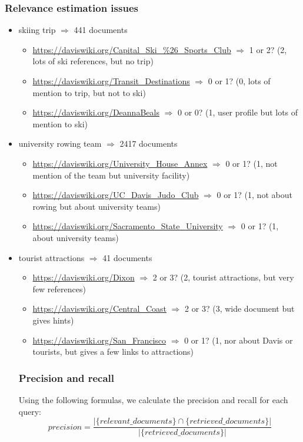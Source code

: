\subsubsection{Relevance estimation issues}
\begin{itemize}
    \item skiing trip $\Rightarrow$ 441 documents
    \begin{itemize}
        \item \url{https://daviswiki.org/Capital\_Ski\_\%26\_Sports\_Club} $\Rightarrow$  1 or 2? (2, lots of ski references, but no trip)
        \item \url{https://daviswiki.org/Transit\_Destinations} $\Rightarrow$  0 or 1? (0, lots of mention to trip, but not to ski)
        \item \url{https://daviswiki.org/DeannaBeals} $\Rightarrow$  0 or 0? (1, user profile but lots of mention to ski)
    \end{itemize}
    \item university rowing team $\Rightarrow$ 2417 documents
    \begin{itemize}
        \item \url{https://daviswiki.org/University\_House\_Annex} $\Rightarrow$  0 or 1? (1, not mention of the team but university facility)
        \item \url{https://daviswiki.org/UC_Davis_Judo_Club} $\Rightarrow$  0 or 1? (1, not about rowing but about university teams)
        \item \url{https://daviswiki.org/Sacramento_State_University} $\Rightarrow$  0 or 1? (1, about university teams)
    \end{itemize}
    \item tourist attractions $\Rightarrow$ 41 documents
    \begin{itemize}
        \item \url{https://daviswiki.org/Dixon} $\Rightarrow$  2 or 3? (2, tourist attractions, but very few references)
        \item \url{https://daviswiki.org/Central\_Coast} $\Rightarrow$  2 or 3? (3, wide document but gives hints)
        \item \url{https://daviswiki.org/San_Francisco} $\Rightarrow$  0 or 1? (1, nor about Davis or tourists, but gives a few links to attractions)
    \end{itemize}
    
\subsubsection{Precision and recall}
Using the following formulas, we calculate the precision and recall for each query:
\begin{equation}
precision = \frac{|\{relevant\_documents\}\cap\{retrieved\_documents\}|}{|\{retrieved\_documents\}|}
\end{equation}


\end{itemize}

